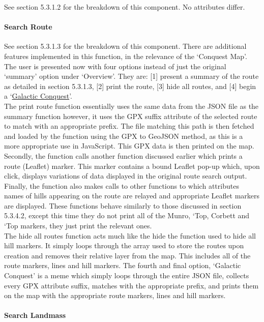 \documentclass[11pt, english]{article}
\begin{document}
	See section 5.3.1.2 for the breakdown of this component. No attributes differ.

			\paragraph{Search Route}

	See section 5.3.1.3 for the breakdown of this component. There are additional features implemented in this function, in the relevance of the `Conquest Map'. The user is presented now with four options instead of just the original `summary' option under `Overview'. They are: [1] present a summary of the route as detailed in section 5.3.1.3, [2] print the route, [3] hide all routes, and [4] begin a `\href{https://www.youtube.com/watch?v=IvaldKgWGHo}{Galactic Conquest}'.\\

	The print route function essentially uses the same data from the JSON file as the summary function however, it uses the GPX suffix attribute of the selected route to match with an appropriate prefix. The file matching this path is then fetched and loaded by the function using the GPX to GeoJSON method, as this is a more appropriate use in JavaScript. This GPX data is then printed on the map. Secondly, the function calls another function discussed earlier which prints a route (Leaflet) marker. This marker contains a bound Leaflet pop-up which, upon click, displays variations of data displayed in the original route search output. Finally, the function also makes calls to other functions to which attributes names of hills appearing on the route are relayed and appropriate Leaflet markers are displayed. These functions behave similarly to those discussed in section 5.3.4.2, except this time they do not print all of the Munro, `Top, Corbett and `Top markers, they just print the relevant ones.\\

	The hide all routes function acts much like the hide the function used to hide all hill markers. It simply loops through the array used to store the routes upon creation and removes their relative layer from the map. This includes all of the route markers, lines and hill markers. The fourth and final option, `Galactic Conquest' is a meme which simply loops through the entire JSON file, collects every GPX attribute suffix, matches with the appropriate prefix, and prints them on the map with the appropriate route markers, lines and hill markers.

			\paragraph{Search Landmass}	
\end{document}
